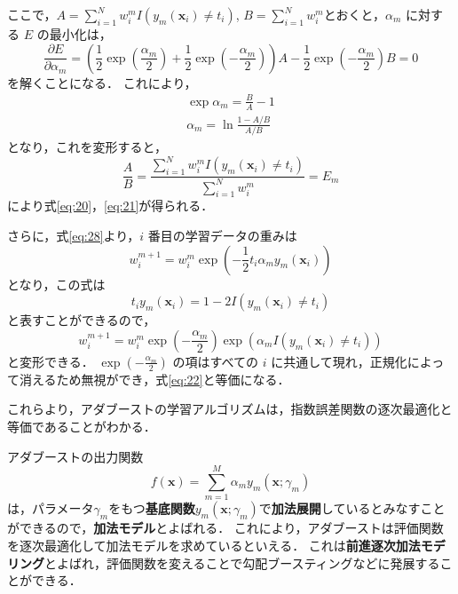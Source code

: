 \documentclass[dvipdfmx]{jreport}
\begin{document}
ここで，$A = \sum_{i = 1}^N w_i^m I(y_m(\bm{x}_i) \neq t_i)$, $B = \sum_{i=1}^N w_i^m$とおくと，$\alpha_m$ に対する $E$ の最小化は，
\begin{equation}
\frac{\partial E}{\partial \alpha_m} = \left(\frac{1}{2} \exp\left(\frac{\alpha_m}{2}\right) + \frac{1}{2} \exp\left(-\frac{\alpha_m}{2}\right)\right) A - \frac{1}{2} \exp\left(-\frac{\alpha_m}{2}\right) B = 0 \label{eq:30}
\end{equation}
を解くことになる．
これにより，
\begin{gather}
\exp\alpha_m = \frac{B}{A} - 1\label{eq:32}\\
\alpha_m = \ln \frac{1-A/B}{A/B}
\end{gather}
となり，これを変形すると，
\begin{equation}
\frac{A}{B} = \frac{\sum_{i=1}^{N} w_i^m I(y_m(\bm{x}_i) \neq t_i)}{\sum_{i=1}^{N} w_i^m} = E_m
\end{equation}
により式\eqref{eq:20}，\eqref{eq:21}が得られる．

さらに，式\eqref{eq:28}より，$i$ 番目の学習データの重みは
\begin{equation}
w_i^{m+1} = w_i^{m} \exp\left(-\frac{1}{2} t_i \alpha_m y_m(\bm{x}_i)\right)
\end{equation}
となり，この式は
\begin{equation}
t_i y_m(\bm{x}_i) = 1 - 2I(y_m(\bm{x}_i) \neq t_i)
\end{equation}
と表すことができるので，
\begin{equation}
w_i^{m+1} = w_i^{m} \exp\left(-\frac{\alpha_m}{2}\right) \exp(\alpha_m I(y_m(\bm{x}_i) \neq t_i))
\end{equation}
と変形できる．
$\exp\left(-\frac{\alpha_m}{2}\right)$ の項はすべての $i$ に共通して現れ，正規化によって消えるため無視ができ，式\eqref{eq:22}と等価になる．

これらより，アダブーストの学習アルゴリズムは，指数誤差関数の逐次最適化と等価であることがわかる．

アダブーストの出力関数
\begin{equation}
    f(\bm{x}) = \sum_{m=1}^{M} \alpha_m y_m(\bm{x};\gamma_m)
\end{equation}
は，パラメータ$\gamma_m$をもつ\textbf{基底関数}$y_m(\bm{x};\gamma_m)$で\textbf{加法展開}しているとみなすことができるので，\textbf{加法モデル}とよばれる．
これにより，アダブーストは評価関数を逐次最適化して加法モデルを求めているといえる．
これは\textbf{前進逐次加法モデリング}とよばれ，評価関数を変えることで勾配ブースティングなどに発展することができる．
\end{document}
